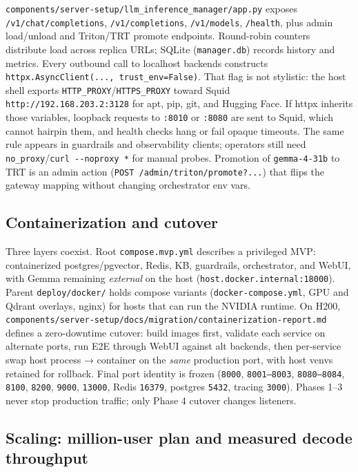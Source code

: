 \documentclass[
  11pt,
]{article}
\begin{document}
\texttt{components/server-setup/llm\_inference\_manager/app.py} exposes
\texttt{/v1/chat/completions}, \texttt{/v1/completions},
\texttt{/v1/models}, \texttt{/health}, plus admin load/unload and
Triton/TRT promote endpoints. Round-robin counters distribute load
across replica URLs; SQLite (\texttt{manager.db}) records history and
metrics. Every outbound call to localhost backends constructs
\texttt{httpx.AsyncClient(...,\ trust\_env=False)}. That flag is not
stylistic: the host shell exports
\texttt{HTTP\_PROXY}/\texttt{HTTPS\_PROXY} toward Squid
\texttt{http://192.168.203.2:3128} for apt, pip, git, and Hugging Face.
If httpx inherits those variables, loopback requests to \texttt{:8010}
or \texttt{:8080} are sent to Squid, which cannot hairpin them, and
health checks hang or fail opaque timeouts. The same rule appears in
guardrails and observability clients; operators still need
\texttt{no\_proxy}/\texttt{curl\ -\/-noproxy\ \textquotesingle{}*\textquotesingle{}}
for manual probes. Promotion of \texttt{gemma-4-31b} to TRT is an admin
action (\texttt{POST\ /admin/triton/promote?...}) that flips the gateway
mapping without changing orchestrator env vars.

\subsection{Containerization and
cutover}\label{containerization-and-cutover}

Three layers coexist. Root \texttt{compose.mvp.yml} describes a
privileged MVP: containerized postgres/pgvector, Redis, KB, guardrails,
orchestrator, and WebUI, with Gemma remaining \emph{external} on the
host (\texttt{host.docker.internal:18000}). Parent
\texttt{deploy/docker/} holds compose variants
(\texttt{docker-compose.yml}, GPU and Qdrant overlays, nginx) for hosts
that can run the NVIDIA runtime. On H200,
\texttt{components/server-setup/docs/migration/containerization-report.md}
defines a zero-downtime cutover: build images first, validate each
service on alternate ports, run E2E through WebUI against alt backends,
then per-service swap host process → container on the \emph{same}
production port, with host venvs retained for rollback. Final port
identity is frozen (\texttt{8000}, \texttt{8001–8003},
\texttt{8080–8084}, \texttt{8100}, \texttt{8200}, \texttt{9000},
\texttt{13000}, Redis \texttt{16379}, postgres \texttt{5432}, tracing
\texttt{3000}). Phases 1--3 never stop production traffic; only Phase 4
cutover changes listeners.

\subsection{Scaling: million-user plan and measured decode
throughput}\label{scaling-million-user-plan-and-measured-decode-throughput}
\end{document}
